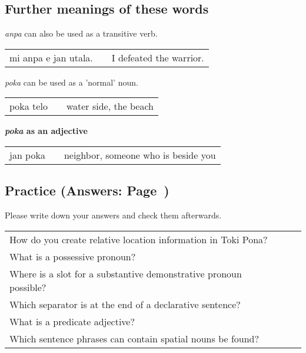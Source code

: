 %
\subsection*{Further meanings of these words}
%

\textit{anpa} can also be used as a transitive verb.

\begin{supertabular}{p{5,5cm}|ll}
mi anpa e jan utala. && I defeated the warrior. \\
\end{supertabular} 


\textit{poka} can be used as a 'normal' noun.

\begin{supertabular}{p{5,5cm}|ll}
poka telo && water side, the beach \\
\end{supertabular} 

\textbf{\textit{poka} as an adjective} \\

\begin{supertabular}{p{5,5cm}|ll}
jan poka && neighbor, someone who is beside you \\
\end{supertabular} 
%

%
\newpage
%
\subsection*{Practice (Answers: Page~\pageref{'other_prepositions'})}
%
Please write down your answers and check them afterwards. 

\begin{supertabular}{p{5,5cm}|ll}
How do you create relative location information in Toki Pona? &&  \\ %
What is a possessive pronoun? && \\ %
Where is a slot for a substantive demonstrative pronoun possible? &&   \\ %
Which separator is at the end of a declarative sentence? &&  \\ %
What is a predicate adjective? &&  \\ %
Which sentence phrases can contain spatial nouns be found? &&   \\ %
\end{supertabular}

